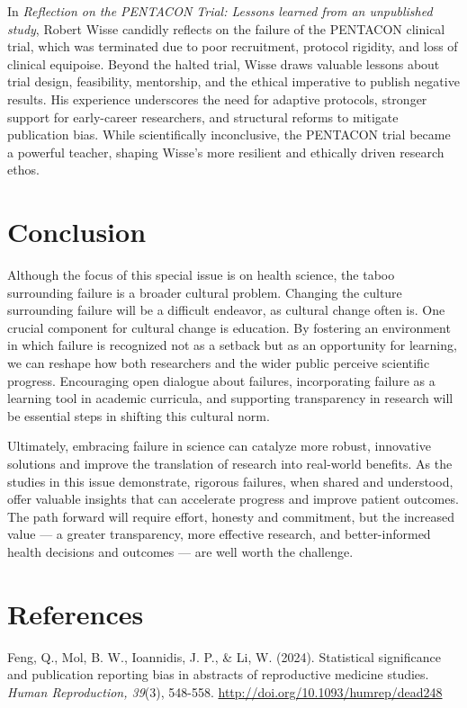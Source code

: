 \documentclass[authordate, empirical]{jote-new-article}
\begin{document}
	In \emph{Reflection on the PENTACON Trial: Lessons learned from an unpublished study}, Robert Wisse candidly reflects on the failure of the PENTACON clinical trial, which was terminated due to poor recruitment, protocol rigidity, and loss of clinical equipoise. Beyond the halted trial, Wisse draws valuable lessons about trial design, feasibility, mentorship, and the ethical imperative to publish negative results. His experience underscores the need for adaptive protocols, stronger support for early-career researchers, and structural reforms to mitigate publication bias. While scientifically inconclusive, the PENTACON trial became a powerful teacher, shaping Wisse's more resilient and ethically driven research ethos.







	\section{Conclusion}
	Although the focus of this special issue is on health science, the taboo surrounding failure is a broader cultural problem. Changing the culture surrounding failure will be a difficult endeavor, as cultural change often is. One crucial component for cultural change is education. By fostering an environment in which failure is recognized not as a setback but as an opportunity for learning, we can reshape how both researchers and the wider public perceive scientific progress. Encouraging open dialogue about failures, incorporating failure as a learning tool in academic curricula, and supporting transparency in research will be essential steps in shifting this cultural norm.



	Ultimately, embracing failure in science can catalyze more robust, innovative solutions and improve the translation of research into real-world benefits. As the studies in this issue demonstrate, rigorous failures, when shared and understood, offer valuable insights that can accelerate progress and improve patient outcomes. The path forward will require effort, honesty and commitment, but the increased value — a greater transparency, more effective research, and better-informed health decisions and outcomes — are well worth the challenge.
	
	\section{References}
	Feng, Q., Mol, B. W., Ioannidis, J. P., \& Li, W. (2024). Statistical significance and publication reporting bias in abstracts of reproductive medicine studies. \emph{Human Reproduction, 39}(3), 548-558. \url{http://doi.org/10.1093/humrep/dead248}
	
\end{document}
